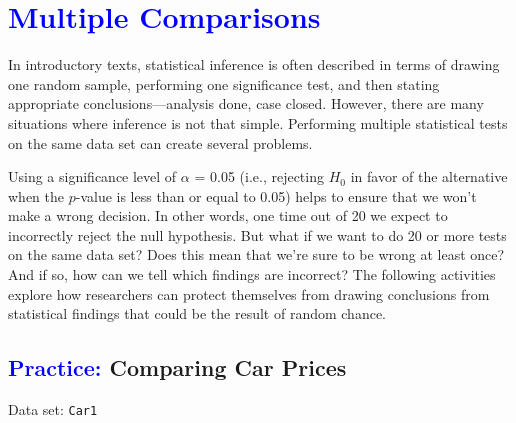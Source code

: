 \documentclass[
]{report}
\begin{document}
\hypertarget{section-12}{%
\section{\texorpdfstring{\textcolor{blue}{Multiple Comparisons}}{}}\label{section-12}}

In introductory texts, statistical inference is often described in terms of drawing one random sample, performing one significance test, and then stating appropriate conclusions---analysis done, case closed. However, there are many situations where inference is not that simple. Performing multiple statistical tests on the same data set can create several problems.

Using a significance level of \(\scriptstyle \alpha\) = 0.05 (i.e., rejecting \(\scriptstyle H_0\) in favor of the alternative when the \(\scriptstyle p\)-value is less than or equal to 0.05) helps to ensure that we won't make a wrong decision. In other words, one time out of 20 we expect to incorrectly reject the null hypothesis. But what if we want to do 20 or more tests on the same data set? Does this mean that we're sure to be wrong at least once? And if so, how can we tell which findings are incorrect? The following activities explore how researchers can protect themselves from drawing conclusions from statistical findings that could be the result of random chance.

\hypertarget{comparing-car-prices}{%
\subsection*{\texorpdfstring{\textcolor{blue}{Practice:} Comparing Car Prices}{ Comparing Car Prices}}\label{comparing-car-prices}}

\vspace{-1em}

Data set: \texttt{Car1}
\end{document}
